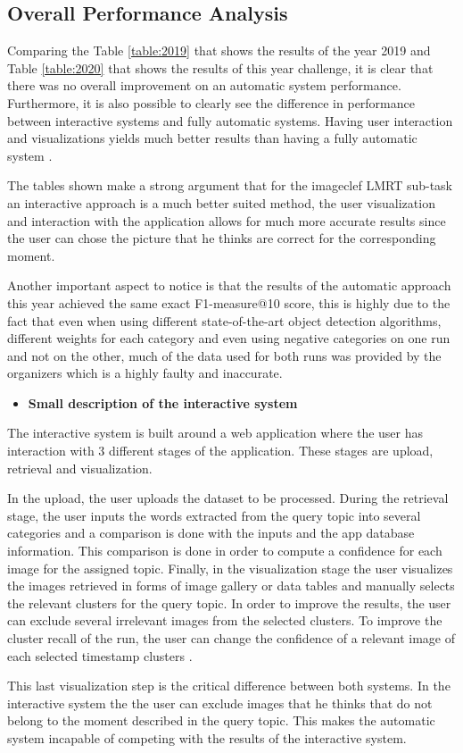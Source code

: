 \subsection{Overall Performance Analysis}
\label{sec:overall_perfomance}

Comparing the Table \ref{table:2019} that shows the results of the year 2019 and Table \ref{table:2020} that shows the results of this year challenge, it is clear that there was no overall improvement on an automatic system performance. Furthermore, it is also possible to clearly see the difference in performance between interactive systems and fully automatic systems. Having user interaction and visualizations yields much better results than having a fully automatic system \cite{Ribeiro2020}.


The tables shown make a strong argument that for the imageclef LMRT sub-task an interactive approach is a much better suited method, the user visualization and interaction with the application allows for much more accurate results since the user can chose the picture that he thinks are correct for the corresponding moment.

Another important aspect to notice is that the results of the automatic approach this year achieved the same exact F1-measure@10 score, this is highly due to the fact that even when using different state-of-the-art object detection algorithms, different weights for each category and even using negative categories on one run and not on the other, much of the data used for both runs was provided by the organizers which is a highly faulty and inaccurate.




\begin{itemize}
  \item \textbf{Small description of the interactive system}
\end{itemize}

The interactive system is built around a web application where the user has interaction with 3 different stages of the application. These stages are upload, retrieval and visualization. 

In the upload, the user uploads the dataset to be processed. During the retrieval stage, the user inputs the words extracted from the query topic into several categories and a comparison is done with the inputs and the app database information. This comparison is done in order to compute a confidence for each image for the assigned topic. Finally, in the visualization stage the user visualizes the images retrieved in forms of image gallery or data tables and manually selects the relevant clusters for the query topic. In order to improve the results, the user can exclude several irrelevant images from the selected clusters. To improve the cluster recall of the run, the user can change the confidence of a relevant image of each selected timestamp clusters \cite{Ribeiro2020}.

This last visualization step is the critical difference between both systems. In the interactive system the the user can exclude images that he thinks that do not belong to the moment described in the query topic. This makes the automatic system incapable of competing with the results of the interactive system.